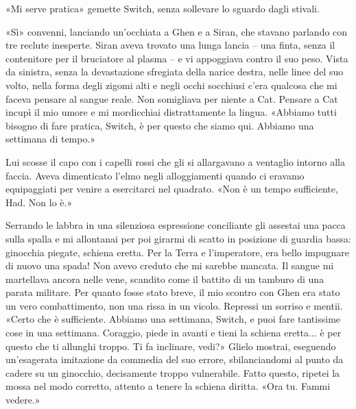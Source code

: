 «Mi serve pratica» gemette Switch, senza sollevare lo sguardo dagli
stivali.

«Sì» convenni, lanciando un'occhiata a Ghen e a Siran, che stavano
parlando con tre reclute inesperte. Siran aveva trovato una lunga lancia
-- una finta, senza il contenitore per il bruciatore al plasma -- e vi
appoggiava contro il suo peso. Vista da sinistra, senza la devastazione
sfregiata della narice destra, nelle linee del suo volto, nella forma
degli zigomi alti e negli occhi socchiusi c'era qualcosa che mi faceva
pensare al sangue reale. Non somigliava per niente a Cat. Pensare a Cat
incupì il mio umore e mi mordicchiai distrattamente la lingua. «Abbiamo
tutti bisogno di fare pratica, Switch, è per questo che siamo qui.
Abbiamo una settimana di tempo.»

Lui scosse il capo con i capelli rossi che gli si allargavano a
ventaglio intorno alla faccia. Aveva dimenticato l'elmo negli
alloggiamenti quando ci eravamo equipaggiati per venire a esercitarci
nel quadrato. «Non è un tempo sufficiente, Had. Non lo è.»

Serrando le labbra in una silenziosa espressione conciliante gli
assestai una pacca sulla spalla e mi allontanai per poi girarmi di
scatto in posizione di guardia bassa: ginocchia piegate, schiena eretta.
Per la Terra e l'imperatore, era bello impugnare di nuovo una spada! Non
avevo creduto che mi sarebbe mancata. Il sangue mi martellava ancora
nelle vene, scandito come il battito di un tamburo di una parata
militare. Per quanto fosse stato breve, il mio scontro con Ghen era
stato un vero combattimento, non una rissa in un vicolo. Repressi un
sorriso e mentii. «Certo che è sufficiente. Abbiamo una settimana,
Switch, e puoi fare tantissime cose in una settimana. Coraggio, piede in
avanti e tieni la schiena eretta... è per questo che ti allunghi troppo.
Ti fa inclinare, vedi?» Glielo mostrai, eseguendo un'esagerata
imitazione da commedia del suo errore, sbilanciandomi al punto da cadere
su un ginocchio, decisamente troppo vulnerabile. Fatto questo, ripetei
la mossa nel modo corretto, attento a tenere la schiena diritta. «Ora
tu. Fammi vedere.»


